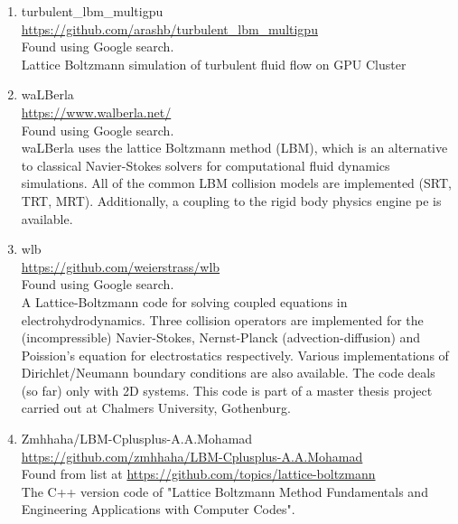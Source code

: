 \documentclass{article}
\begin{document}
\begin{enumerate}
	\item turbulent\_lbm\_multigpu
\\
	\href{https://github.com/arashb/turbulent_lbm_multigpu}{https://github.com/arashb/turbulent\_lbm\_multigpu}
\\
	Found using Google search.\\
	Lattice Boltzmann simulation of turbulent fluid flow on GPU Cluster
	
	\item waLBerla
\\
	\href{https://www.walberla.net/}{https://www.walberla.net/}
\\
	Found using Google search.\\
	waLBerla uses the lattice Boltzmann method (LBM), which is an alternative to classical Navier-Stokes solvers for computational fluid dynamics simulations. All of the common LBM collision models are implemented (SRT, TRT, MRT). Additionally, a coupling to the rigid body physics engine pe is available. 
	
	\item wlb
\\
	\href{https://github.com/weierstrass/wlb}{https://github.com/weierstrass/wlb}
\\
	Found using Google search.\\
	A Lattice-Boltzmann code for solving coupled equations in electrohydrodynamics. 
	Three collision operators are implemented for the (incompressible) Navier-Stokes, 
	Nernst-Planck (advection-diffusion) and Poission's equation for electrostatics 
	respectively. Various implementations of Dirichlet/Neumann boundary conditions 
	are also available. The code deals (so far) only with 2D systems.
	This code is part of a  master thesis project carried out at Chalmers University, 
	Gothenburg.
	
	\item Zmhhaha/LBM-Cplusplus-A.A.Mohamad
\\
	\href{https://github.com/zmhhaha/LBM-Cplusplus-A.A.Mohamad}{https://github.com/zmhhaha/LBM-Cplusplus-A.A.Mohamad} \\
		Found from list at \href{https://github.com/topics/lattice-boltzmann}{https://github.com/topics/lattice-boltzmann}\\
	The C++ version code of "Lattice Boltzmann Method Fundamentals and Engineering Applications with Computer Codes".
	
\end{enumerate}
\end{document}
